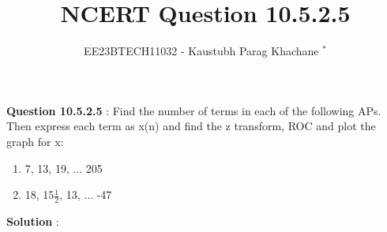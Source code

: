 \documentclass[journal,12pt,twocolumn]{IEEEtran}
\theoremstyle{remark}
\begin{document}

\vspace{3cm}

\Large\title{NCERT Question 10.5.2.5}
\large\author{EE23BTECH11032 - Kaustubh Parag Khachane $^{*}$%
}
\maketitle
\newpage
\bigskip

\renewcommand{\thefigure}{\theenumi}
\renewcommand{\thetable}{\theenumi}
\large\textbf{Question 10.5.2.5} : \normalsize Find the number of terms in each of the following APs. Then express each term as x(n) and find the z transform, ROC and plot the graph for x: 
\begin{enumerate}
    \item 7, 13, 19, ... 205

    \item 18, 15$\frac{1}{2}$, 13, ... -47
\end{enumerate}



\large\textbf{Solution} :\normalsize
\end{document}
